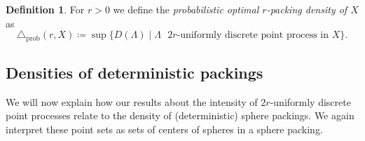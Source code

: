 \documentclass[12pt,reqno,a4paper]{amsart}
\theoremstyle{theorem}
\theoremstyle{definition}
\newtheorem{definition}[theorem]{Definition}
\numberwithin{theorem}{section}
\numberwithin{equation}{section}
\begin{document}
\begin{definition}\label{d:definition_prob_optimal_density}
	For $r>0$ we define the \emph{probabilistic optimal $r$-packing density of $X$} as
	\[\triangle_{\mathrm{prob}}(r,X)\coloneqq \sup \{D(\Lambda)\mid \Lambda\text{ $2r$-uniformly discrete point process in $X$}\}.\]
\end{definition}

\subsection{Densities of deterministic packings}\label{s:deterministic_packings}
We will now explain how our results about the intensity of $2r$-uniformly discrete point processes relate to the density of (deterministic) sphere packings. We again interpret these point sets as sets of centers of spheres in a sphere packing.
\end{document}
